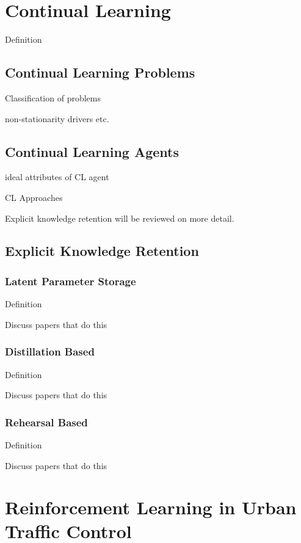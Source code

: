 







\section{Continual Learning}

Definition

\subsection{Continual Learning Problems}

Classification of problems

non-stationarity drivers etc.

\subsection{Continual Learning Agents}

ideal attributes of CL agent

CL Approaches

Explicit knowledge retention will be reviewed on more detail.

\subsection{Explicit Knowledge Retention}

\subsubsection{Latent Parameter Storage}

Definition

Discuss papers that do this

\subsubsection{Distillation Based}

Definition

Discuss papers that do this

\subsubsection{Rehearsal Based}

Definition

Discuss papers that do this


\section{Reinforcement Learning in Urban Traffic Control}